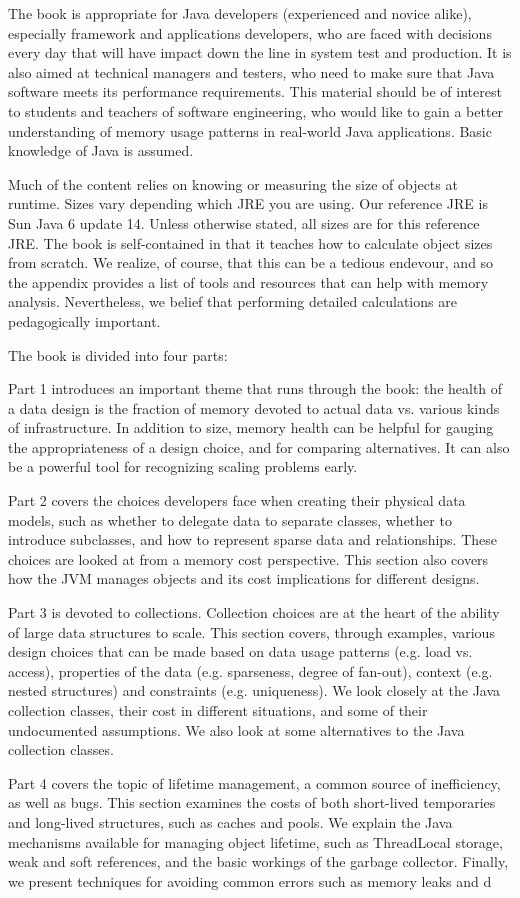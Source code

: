 The book is appropriate for Java developers (experienced and novice alike), especially framework and applications developers, who are faced with decisions every day that will have impact down the line in system test and production. It is also aimed at technical managers and testers, who need to make sure that Java software meets its performance requirements.  This material should be of interest to students and teachers of software engineering, who would like to gain a better understanding of memory usage patterns in real-world Java applications. Basic knowledge of Java is assumed.

Much of the content relies on knowing or measuring the size of objects at runtime. Sizes vary depending which JRE you are using. Our reference JRE is Sun Java 6 update 14. Unless otherwise stated, all sizes are for this reference JRE. The book is self-contained in that it teaches how to calculate object sizes from scratch. We realize, of course, that this can be a tedious endevour, and so the appendix provides a list of tools and resources that can help with memory analysis. Nevertheless, we belief that performing detailed calculations are pedagogically important. 


The book is divided into four parts:

Part 1 introduces an important theme that runs through the book: the
health of a data design is the fraction of memory devoted to actual data vs. various kinds of infrastructure. In addition to size, memory health can be helpful for gauging the appropriateness of a design choice, and for comparing alternatives. It can also be a powerful tool for recognizing scaling problems early.

Part 2 covers the choices developers face when creating their physical data models, such as whether to delegate data to separate classes, whether to introduce subclasses, and how to represent sparse data and relationships. These choices are looked at from a memory cost perspective. This section also covers how the JVM manages objects and its cost implications for different designs.
  
Part 3 is devoted to collections. Collection choices are at the heart of the ability of large data structures to scale. This section covers, through examples, various design choices that can be made based on data usage patterns (e.g. load vs. access), properties of the data (e.g. sparseness, degree of fan-out), context (e.g. nested structures) and constraints (e.g. uniqueness).  We look closely at the Java collection classes, their cost in different situations, and some of their undocumented assumptions. We also look at some alternatives to the Java collection classes.
 
Part 4 covers the topic of lifetime management, a common source of inefficiency, as well as bugs. This section examines the costs of both short-lived temporaries and long-lived structures, such as caches and pools.  We explain the Java mechanisms available for managing object lifetime, such as ThreadLocal storage, weak and soft references, and the basic workings of the garbage collector. Finally, we present techniques for avoiding common errors such as memory leaks and d

